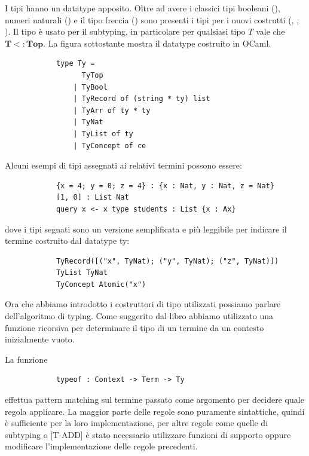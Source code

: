         I tipi hanno un datatype apposito. Oltre ad avere i classici tipi booleani (), numeri naturali () e il tipo freccia () 
        sono presenti i tipi per i nuovi costrutti (, , ). Il tipo  è usato per il subtyping, in particolare per
        qualsiasi tipo $T$ vale che $\boldsymbol{T <: Top}$. La figura sottostante mostra il datatype costruito in OCaml.
        \begin{verbatim}
            type Ty =
                  TyTop 
                | TyBool 
                | TyRecord of (string * ty) list 
                | TyArr of ty * ty 
                | TyNat 
                | TyList of ty
                | TyConcept of ce
        \end{verbatim}
        Alcuni esempi di tipi assegnati ai relativi termini possono essere:
        \begin{verbatim}
            {x = 4; y = 0; z = 4} : {x : Nat, y : Nat, z = Nat}
            [1, 0] : List Nat
            query x <- x type students : List {x : Ax}
        \end{verbatim}
        dove i tipi segnati sono un versione semplificata e più leggibile per indicare il termine costruito dal datatype ty:
        \begin{verbatim}
            TyRecord([("x", TyNat); ("y", TyNat); ("z", TyNat)])
            TyList TyNat
            TyConcept Atomic("x")
        \end{verbatim}
        Ora che abbiamo introdotto i costruttori di tipo utilizzati possiamo parlare dell'algoritmo di typing.
        Come suggerito dal libro \cite{TypesAndProgrammingLanguages} abbiamo utilizzato una funzione ricorsiva per determinare il tipo di un termine da un contesto
        inizialmente vuoto.
 
 La funzione   
        \begin{verbatim}
            typeof : Context -> Term -> Ty
        \end{verbatim}
 effettua pattern matching sul termine passato come argomento per decidere quale regola applicare. La maggior parte delle regole sono puramente
        sintattiche, quindi  è sufficiente per la loro implementazione, per altre regole come quelle di subtyping o [T-ADD] è stato necessario utilizzare funzioni di supporto
        oppure modificare l'implementazione delle regole precedenti. 
        

